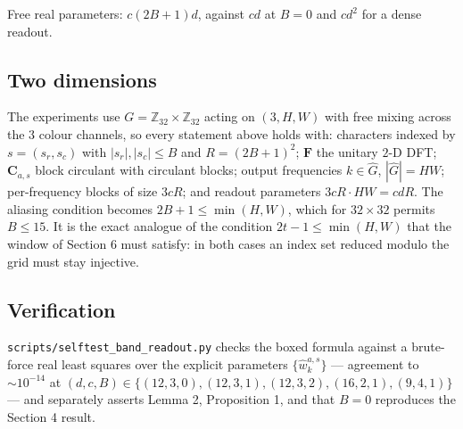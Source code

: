 Free real parameters: $c(2B+1)d$, against $cd$ at $B=0$ and $cd^{2}$ for a dense
readout.

\subsection{Two dimensions}

The experiments use $G=\mathbb{Z}_{32}\times\mathbb{Z}_{32}$ acting on $(3,H,W)$ with
free mixing across the $3$ colour channels, so every statement above holds with:
characters indexed by $s=(s_{r},s_{c})$ with $|s_{r}|,|s_{c}|\le B$ and
$R=(2B+1)^{2}$; $\boldsymbol{F}$ the unitary $2$-D DFT; $\boldsymbol{C}_{a,s}$ block
circulant with circulant blocks; output frequencies $k\in\hat{G}$, $|\hat{G}|=HW$;
per-frequency blocks of size $3cR$; and readout parameters $3cR\cdot HW=cdR$. The
aliasing condition becomes $2B+1\le\min(H,W)$, which for $32\times32$ permits
$B\le15$. It is the exact analogue of the condition $2t-1\le\min(H,W)$ that the
window of Section 6 must satisfy: in both cases an index set reduced modulo the grid
must stay injective.

\subsection{Verification}

\texttt{scripts/selftest\_band\_readout.py} checks the boxed formula against a
brute-force real least squares over the explicit parameters
$\{\hat{w}^{a,s}_{k}\}$ --- agreement to $\sim10^{-14}$ at
$(d,c,B)\in\{(12,3,0),(12,3,1),(12,3,2),(16,2,1),(9,4,1)\}$ --- and separately asserts
Lemma 2, Proposition 1, and that $B=0$ reproduces the Section 4 result.
